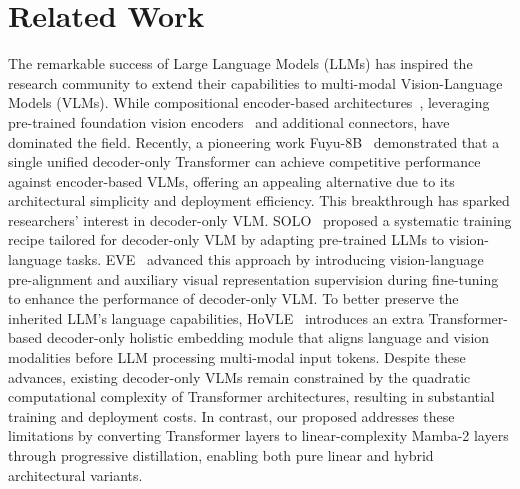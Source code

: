 \section{Related Work}
The remarkable success of Large Language Models (LLMs) has inspired the research community to extend their capabilities to multi-modal Vision-Language Models (VLMs).
While compositional encoder-based architectures~\cite{llava,internvl,monkey,blip}, leveraging pre-trained foundation vision encoders~\cite{eva, eva02, evaclip, sigclip} and additional connectors, have dominated the field. Recently, a pioneering work Fuyu-8B~\cite{fuyu} demonstrated that a single unified decoder-only Transformer can achieve competitive performance against encoder-based VLMs, offering an appealing alternative due to its architectural simplicity and deployment efficiency.
This breakthrough has sparked researchers' interest in decoder-only VLM. 
SOLO~\cite{solo} proposed a systematic training recipe tailored for decoder-only VLM by adapting pre-trained LLMs to vision-language tasks.
EVE~\cite{eve} advanced this approach by introducing vision-language pre-alignment and auxiliary visual representation supervision during fine-tuning to enhance the performance of decoder-only VLM.
To better preserve the inherited LLM's language capabilities, HoVLE~\cite{hovle} introduces an extra Transformer-based decoder-only holistic embedding module that aligns language and vision modalities before LLM processing multi-modal input tokens.
Despite these advances, existing decoder-only VLMs remain constrained by the quadratic computational complexity of Transformer architectures, resulting in substantial training and deployment costs. In contrast, our proposed \name{} addresses these limitations by converting Transformer layers to linear-complexity Mamba-2 layers through progressive distillation, enabling both pure linear and hybrid architectural variants.


